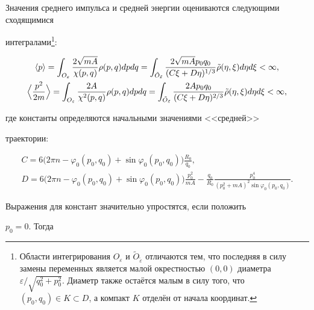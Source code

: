  Значения среднего импульса и  средней энергии оцениваются следующими сходящимися

 интегралами\footnote{ Области интегрирования $O_{\varepsilon}$ и $\tilde{O}_{\tilde{\varepsilon}}$ отличаются тем, что последняя в силу замены переменных является малой окрестностью $(0,0)$  диаметра $\varepsilon/\sqrt{q_0^2+p_0^2}$. Диаметр также остаётся малым в силу того, что $(p_0,q_0)\in K \subset D$, а  компакт $K$ отделён от начала координат.}\!:

\begin{gather}

\langle p\rangle

=\int_{O_{\varepsilon}}\frac{2\sqrt{mA}}{\chi(p,q)}\rho(p,q)dpdq=\int_{\tilde{O}_{\tilde{\varepsilon}}}\frac{2\sqrt{mA}

p_0 q_0}{(C\xi +

D\eta)^{1/3}}\tilde{\rho}(\eta,\xi)d\eta d\xi <\infty,

\\

\Bigl\langle\frac{p^2}{2m}\Bigr\rangle=\int_{O_{\varepsilon}}\frac{2A}{\chi^2(p,q)}\rho(p,q)dp

dq =\int_{\tilde{O}_{\tilde{\varepsilon}}}\frac{2A p_0 q_0}{(C\xi

+ D\eta)^{2/3}}\tilde{\rho}(\eta,\xi)d\eta d\xi <\infty,


\end{gather}

где константы определяются начальными значениями <<средней>>

траектории:

\begin{gather}

C=6\bigl(2\pi n-\varphi_0(p_0, q_0)+\sin\varphi_0(p_0, q_0) \bigr)\frac{R_0}{q_0},

\\

D=6\bigl(2\pi n-\varphi_0(p_0, q_0)+\sin\varphi_0(p_0, q_0) \bigr)\frac{p_0^2}{mA}-\frac{q_0}{R_0}\frac{p_0^4 }{(p_0^2+

mA)^2\sin\varphi_0(p_0, q_0)}.

\end{gather}

 Выражения для констант значительно упростятся, если положить

 $p_0=0$. Тогда

